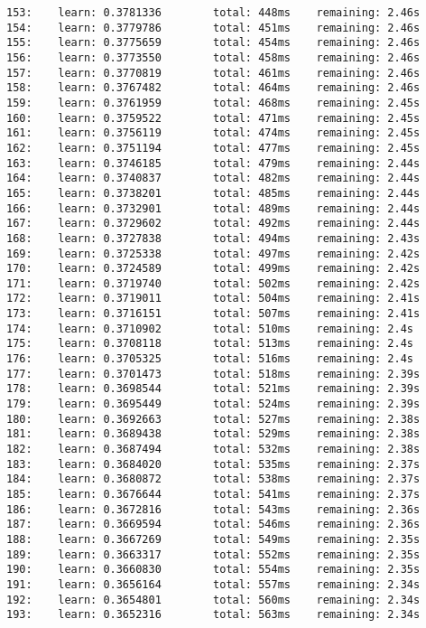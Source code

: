 \documentclass[11pt]{article}
\begin{document}
\begin{Verbatim}[commandchars=\\\{\}]
153:    learn: 0.3781336        total: 448ms    remaining: 2.46s
154:    learn: 0.3779786        total: 451ms    remaining: 2.46s
155:    learn: 0.3775659        total: 454ms    remaining: 2.46s
156:    learn: 0.3773550        total: 458ms    remaining: 2.46s
157:    learn: 0.3770819        total: 461ms    remaining: 2.46s
158:    learn: 0.3767482        total: 464ms    remaining: 2.46s
159:    learn: 0.3761959        total: 468ms    remaining: 2.45s
160:    learn: 0.3759522        total: 471ms    remaining: 2.45s
161:    learn: 0.3756119        total: 474ms    remaining: 2.45s
162:    learn: 0.3751194        total: 477ms    remaining: 2.45s
163:    learn: 0.3746185        total: 479ms    remaining: 2.44s
164:    learn: 0.3740837        total: 482ms    remaining: 2.44s
165:    learn: 0.3738201        total: 485ms    remaining: 2.44s
166:    learn: 0.3732901        total: 489ms    remaining: 2.44s
167:    learn: 0.3729602        total: 492ms    remaining: 2.44s
168:    learn: 0.3727838        total: 494ms    remaining: 2.43s
169:    learn: 0.3725338        total: 497ms    remaining: 2.42s
170:    learn: 0.3724589        total: 499ms    remaining: 2.42s
171:    learn: 0.3719740        total: 502ms    remaining: 2.42s
172:    learn: 0.3719011        total: 504ms    remaining: 2.41s
173:    learn: 0.3716151        total: 507ms    remaining: 2.41s
174:    learn: 0.3710902        total: 510ms    remaining: 2.4s
175:    learn: 0.3708118        total: 513ms    remaining: 2.4s
176:    learn: 0.3705325        total: 516ms    remaining: 2.4s
177:    learn: 0.3701473        total: 518ms    remaining: 2.39s
178:    learn: 0.3698544        total: 521ms    remaining: 2.39s
179:    learn: 0.3695449        total: 524ms    remaining: 2.39s
180:    learn: 0.3692663        total: 527ms    remaining: 2.38s
181:    learn: 0.3689438        total: 529ms    remaining: 2.38s
182:    learn: 0.3687494        total: 532ms    remaining: 2.38s
183:    learn: 0.3684020        total: 535ms    remaining: 2.37s
184:    learn: 0.3680872        total: 538ms    remaining: 2.37s
185:    learn: 0.3676644        total: 541ms    remaining: 2.37s
186:    learn: 0.3672816        total: 543ms    remaining: 2.36s
187:    learn: 0.3669594        total: 546ms    remaining: 2.36s
188:    learn: 0.3667269        total: 549ms    remaining: 2.35s
189:    learn: 0.3663317        total: 552ms    remaining: 2.35s
190:    learn: 0.3660830        total: 554ms    remaining: 2.35s
191:    learn: 0.3656164        total: 557ms    remaining: 2.34s
192:    learn: 0.3654801        total: 560ms    remaining: 2.34s
193:    learn: 0.3652316        total: 563ms    remaining: 2.34s

\end{Verbatim}
\end{document}
